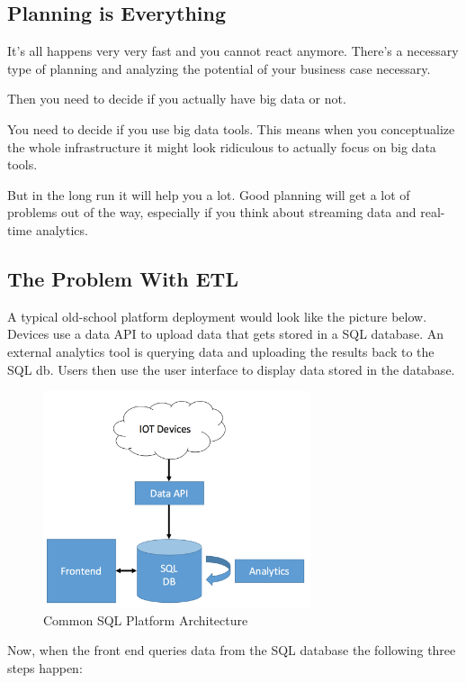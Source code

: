 \documentclass[12pt, numbers=noenddot]{scrreprt} %
\begin{document}
\subsection{Planning is Everything}

It’s all happens very very fast and you cannot react anymore. There’s a necessary type of planning and analyzing the potential of your business case necessary.

Then you need to decide if you actually have big data or not.

You need to decide if you use big data tools. This means when you conceptualize the whole infrastructure it might look ridiculous to actually focus on big data tools.

But in the long run it will help you a lot. Good planning will get a lot of problems out of the way, especially if you think about streaming data and real-time analytics.

\subsection{The Problem With ETL}
A typical old-school platform deployment would look like the picture below. Devices use a data API to upload data that gets stored in a SQL database. An external analytics tool is querying data and uploading the results back to the SQL db. Users then use the user interface to display data stored in the database.

\begin{figure}[htbp]
  \centering
     \includegraphics[width=0.7\textwidth]{images/Common-SQL-Architecture}
  \caption{Common SQL Platform Architecture}
  \label{fig:Bild1}
\end{figure}

Now, when the front end queries data from the SQL database the following three steps happen:
\end{document}
